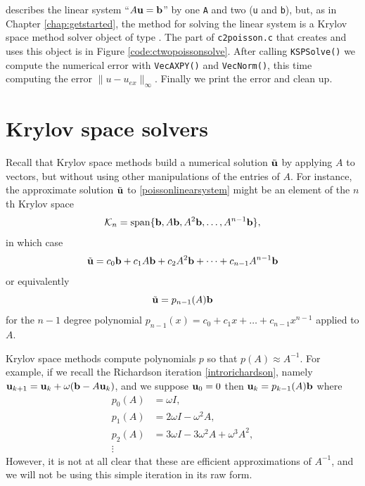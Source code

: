 
\vfill
\newpage
\PETSc describes the linear system ``$A\mathbf{u}=\mathbf{b}$'' by one \pMat \texttt{A} and two \pVecs (\texttt{u} and \texttt{b}), but, as in Chapter \ref{chap:getstarted}, the method for solving the linear system is a Krylov space method solver object of type \pKSP.  The part of \texttt{c2poisson.c} that creates and uses this object is in Figure \ref{code:ctwopoissonsolve}.  After calling \texttt{KSPSolve()} we compute the numerical error with \texttt{VecAXPY()} and \texttt{VecNorm()}, this time computing the error $\|u-u_{ex}\|_\infty$.  Finally we print the error and clean up.



\section{Krylov space solvers}

Recall that Krylov space methods \citep{TrefethenBau} build a numerical solution $\tilde{\mathbf{u}}$ by applying $A$ to vectors, but without using other manipulations of the entries of $A$.  For instance, the approximate solution $\tilde{\mathbf{u}}$ to \eqref{poissonlinearsystem} might be an element of the $n$th Krylov space
    $$\mathcal{K}_n = \operatorname{span}\{\mathbf{b},A\mathbf{b},A^2\mathbf{b},\dots,A^{n-1}\mathbf{b}\},$$
in which case
    $$\tilde{\mathbf{u}} = c_0 \mathbf{b} + c_1 A \mathbf{b} + c_2 A^2 \mathbf{b} + \dots + c_{n-1} A^{n-1} \mathbf{b}$$
or equivalently
    $$\tilde{\mathbf{u}} = p_{n-1}(A) \mathbf{b}$$
for the $n-1$ degree polynomial $p_{n-1}(x) = c_0 + c_1 x + \dots + c_{n-1} x^{n-1}$ applied to $A$.

Krylov space methods compute polynomials $p$ so that $p(A) \approx A^{-1}$.  For example, if we recall the Richardson iteration \eqref{introrichardson}, namely $\mathbf{u}_{k+1} = \mathbf{u}_k + \omega (\mathbf{b} - A \mathbf{u}_k)$, and we suppose $\mathbf{u}_0=0$ then $\mathbf{u}_k = p_{k-1}(A) \mathbf{b}$ where
\begin{align*}
p_0(A) &= \omega I, \\
p_1(A) &= 2 \omega I - \omega^2 A, \\
p_2(A) &= 3 \omega I - 3 \omega^2 A + \omega^3 A^2, \\
\vdots
\end{align*}
However, it is not at all clear that these are efficient approximations of $A^{-1}$, and we will not be using this simple iteration in its raw form.

